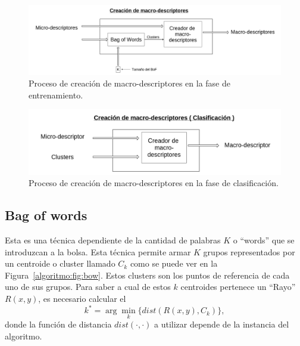 	\begin{figure}[bt]
		\centering
    		\includegraphics[width=1\textwidth]{Figuras/Diagramas/Extractor_macrodescriptores_entrenamiento.png}
  		\caption{Proceso de creación de macro-descriptores en la fase de entrenamiento.}
  		\label{algoritmo:fig:macro_descriptores:entrenamiento}
	\end{figure}	
	
	
	\begin{figure}[bt]
		\centering
    		\includegraphics[width=1\textwidth]{Figuras/Diagramas/Extractor_macrodescriptores_clasificacion.png}
  		\caption{Proceso de creación de macro-descriptores en la fase de clasificación.}
  		\label{algoritmo:fig:macro_descriptores:clasificacion}
	\end{figure}	

	\subsection{Bag of words}
	\label{algoritmo:bow}
		Esta es una técnica dependiente de la cantidad de palabras $K$ o ``words'' que se introduzcan a la bolsa. Esta técnica permite armar $K$ grupos representados por un centroide o cluster llamado $C_k$ como se puede ver en la Figura~\ref{algoritmo:fig:bow}. Estos clusters son los puntos de referencia de cada uno de sus grupos. Para saber a cual de estos $k$ centroides pertenece un ``Rayo'' $R(x,y)$, es necesario calcular el
		\begin{equation}
  			\label{algoritmo:eq:dist}
			k^* = \arg \min_k \{\mathit{dist}(R(x,y),C_k)\},
		\end{equation}
		donde la función de distancia $\mathit{dist}(\cdot,\cdot)$ a utilizar depende de la instancia del algoritmo.

